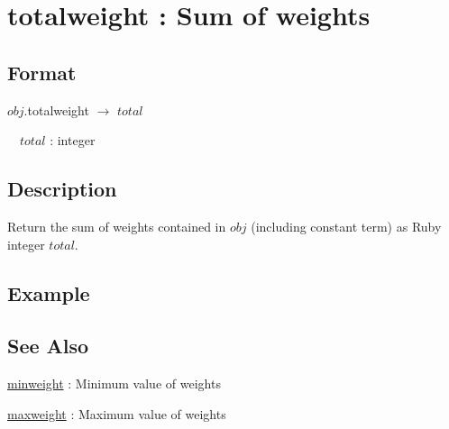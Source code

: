 
\section{totalweight : Sum of weights\label{sect:totalweight}}
\subsection*{Format}
$obj$.totalweight $\rightarrow$ $total$

~~$total$ : integer

\subsection*{Description}
Return the sum of weights contained in $obj$ (including constant term) as Ruby integer $total$. 

\subsection*{Example}


\subsection*{See Also}
\hyperref[sect:minweight]{minweight} : Minimum value of weights

\hyperref[sect:maxweight]{maxweight} : Maximum value of weights
